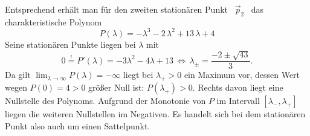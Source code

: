 {Entsprechend erhält man für den zweiten stationären Punkt \ $\vec p_2$ \ das charakteristische Polynom
	\[
	P(\lambda) = -\lambda^3-2\,\lambda^2+13\,\lambda+4 
\]
Seine station\"aren Punkte liegen bei $\lambda$ mit 
$$0\overset!= P'(\lambda)=-3\lambda^2-4\lambda+13\,\Leftrightarrow \, \lambda_\pm=\frac
{-2 \pm \sqrt{43}}3.$$
Da gilt $\lim_{\lambda\to\infty}P(\lambda)=-\infty$ liegt bei $\lambda_+>0$ ein Maximum vor, dessen
Wert wegen $P(0)=4>0$ gr\"oßer Null ist: $P(\lambda_+)>0$. Rechts davon liegt eine Nullstelle des
Polynoms. Aufgrund der Monotonie von $P$ im Intervall $[\lambda_-,\lambda_+]$ liegen die weiteren
Nullstellen im Negativen. Es handelt sich bei dem stationären Punkt also auch um einen Sattelpunkt. 
}


